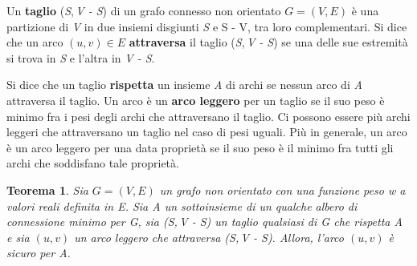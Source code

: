 \documentclass[10pt, a4paper]{report}
\newtheorem{theorem}{Teorema}[chapter]
\begin{document}
Un \textbf{taglio} (\textit{S},\,\textit{V - S}) di un grafo connesso non orientato $G = (V,E)$ è una partizione di \textit{V} in due insiemi disgiunti \textit{S} e \textsc{S - V}, tra loro complementari. Si dice che un arco $(u,v) \in E$ \textbf{attraversa} il taglio (\textit{S},\,\textit{V - S}) se una delle sue estremità si trova in \textit{S} e l'altra in \textit{V - S}.

Si dice che un taglio \textbf{rispetta} un insieme \textit{A} di archi se nessun arco di \textit{A} attraversa il taglio. Un arco è un \textbf{arco leggero} per un taglio se il suo peso è minimo fra i pesi degli archi che attraversano il taglio. Ci possono essere più archi leggeri che attraversano un taglio nel caso di pesi uguali. Più in generale, un arco è un arco leggero per una data proprietà se il suo peso è il minimo fra tutti gli archi che soddisfano tale proprietà.
\begin{theorem}
Sia $G = (V,E)$ un grafo non orientato con una funzione peso \textit{w} a valori reali definita in \textit{E}. Sia \textit{A} un sottoinsieme di un qualche albero di connessione minimo per \textit{G}, sia (\textit{S},\,\textit{V - S}) un taglio qualsiasi di \textit{G} che rispetta \textit{A} e sia $(u,v)$ un arco leggero che attraversa (\textit{S},\,\textit{V - S}). Allora, l'arco $(u,v)$ è sicuro per \textit{A}.
\end{theorem}
\end{document}

